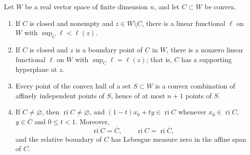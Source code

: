 \begin{lemma}\label{lem:finite-dimensional-convex-separation}
Let $W$ be a real vector space of finite dimension $n$, and let $C\subset W$ be convex.
\begin{enumerate}
\item If $C$ is closed and nonempty and $z\in W\setminus C$, there is a linear functional $\ell$ on $W$ with $\sup_C\ell<\ell(z)$.
\item If $C$ is closed and $z$ is a boundary point of $C$ in $W$, there is a nonzero linear functional $\ell$ on $W$ with $\sup_C\ell=\ell(z)$; that is, $C$ has a supporting hyperplane at $z$.
\item Every point of the convex hull of a set $S\subset W$ is a convex combination of affinely independent points of $S$, hence of at most $n+1$ points of $S$.
\item If $C\neq\varnothing$, then $\operatorname{ri}C\neq\varnothing$, and $(1-t)x_0+ty\in\operatorname{ri}C$ whenever $x_0\in\operatorname{ri}C$, $y\in\overline C$ and $0\leq t<1$. Moreover,
\[
 \overline{\operatorname{ri}C}=\overline C,\qquad
 \operatorname{ri}C=\operatorname{ri}\overline C,
\]
and the relative boundary of $C$ has Lebesgue measure zero in the affine span of $C$.
\end{enumerate}
\end{lemma}
